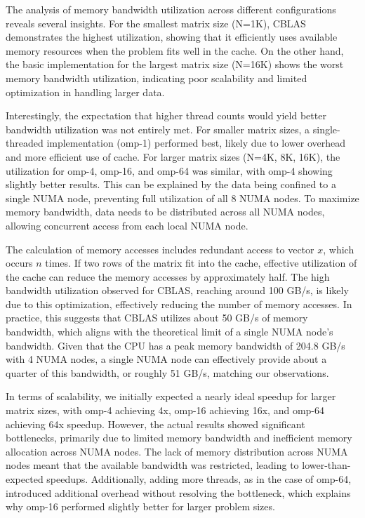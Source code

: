 The analysis of memory bandwidth utilization across different configurations reveals several insights. For the smallest matrix size (N=1K), CBLAS demonstrates the highest utilization, showing that it efficiently uses available memory resources when the problem fits well in the cache. On the other hand, the basic implementation for the largest matrix size (N=16K) shows the worst memory bandwidth utilization, indicating poor scalability and limited optimization in handling larger data.

Interestingly, the expectation that higher thread counts would yield better bandwidth utilization was not entirely met. For smaller matrix sizes, a single-threaded implementation (omp-1) performed best, likely due to lower overhead and more efficient use of cache. For larger matrix sizes (N=4K, 8K, 16K), the utilization for omp-4, omp-16, and omp-64 was similar, with omp-4 showing slightly better results. This can be explained by the data being confined to a single NUMA node, preventing full utilization of all 8 NUMA nodes. To maximize memory bandwidth, data needs to be distributed across all NUMA nodes, allowing concurrent access from each local NUMA node.

The calculation of memory accesses includes redundant access to vector \(x\), which occurs \(n\) times. If two rows of the matrix fit into the cache, effective utilization of the cache can reduce the memory accesses by approximately half. The high bandwidth utilization observed for CBLAS, reaching around 100 GB/s, is likely due to this optimization, effectively reducing the number of memory accesses. In practice, this suggests that CBLAS utilizes about 50 GB/s of memory bandwidth, which aligns with the theoretical limit of a single NUMA node's bandwidth. Given that the CPU has a peak memory bandwidth of 204.8 GB/s with 4 NUMA nodes, a single NUMA node can effectively provide about a quarter of this bandwidth, or roughly 51 GB/s, matching our observations.

In terms of scalability, we initially expected a nearly ideal speedup for larger matrix sizes, with omp-4 achieving 4x, omp-16 achieving 16x, and omp-64 achieving 64x speedup. However, the actual results showed significant bottlenecks, primarily due to limited memory bandwidth and inefficient memory allocation across NUMA nodes. The lack of memory distribution across NUMA nodes meant that the available bandwidth was restricted, leading to lower-than-expected speedups. Additionally, adding more threads, as in the case of omp-64, introduced additional overhead without resolving the bottleneck, which explains why omp-16 performed slightly better for larger problem sizes.

